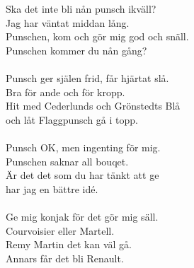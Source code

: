 {\footnotesize{}}\\
\\
Ska det inte bli nån punsch ikväll?\\
Jag har väntat middan lång.\\
Punschen, kom och gör mig god och snäll.\\
Punschen kommer du nån gång?\\
\\
Punsch ger själen frid, får hjärtat slå.\\
Bra för ande och för kropp.\\
Hit med Cederlunds och Grönstedts Blå\\
och låt Flaggpunsch gå i topp.\\
\\
Punsch OK, men ingenting för mig.\\
Punschen saknar all bouqet.\\
Är det det som du har tänkt att ge\\
har jag en bättre idé.\\
\\
Ge mig konjak för det gör mig säll.\\
Courvoisier eller Martell.\\
Remy Martin det kan väl gå.\\
Annars får det bli Renault.\\
\\
{\footnotesize{}}
